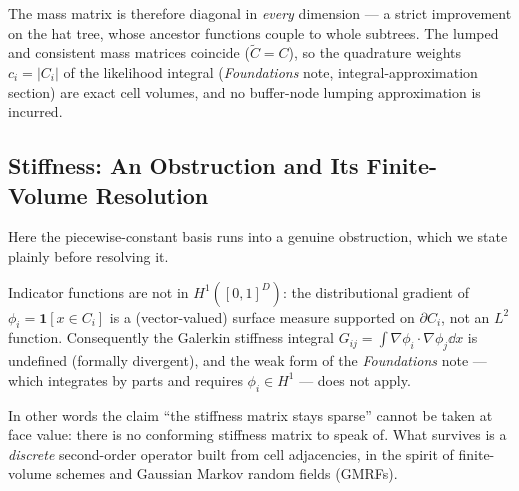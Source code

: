 \documentclass[11pt]{article}
\begin{document}
The mass matrix is therefore diagonal in \emph{every} dimension --- a strict
improvement on the hat tree, whose ancestor functions couple to whole subtrees.
The lumped and consistent mass matrices coincide ($\tilde C=C$), so the
quadrature weights $c_i=|C_i|$ of the likelihood integral
(\emph{Foundations} note, integral-approximation section) are exact cell volumes,
and no buffer-node lumping approximation is incurred.

\subsection{Stiffness: An Obstruction and Its Finite-Volume Resolution}
\label{sec:const-stiffness}

Here the piecewise-constant basis runs into a genuine obstruction, which we state
plainly before resolving it.

\begin{proposition}
\label{prop:const-stiff-illdef}
Indicator functions are not in $H^1([0,1]^D)$: the distributional gradient of
$\phi_i=\mathbf 1[x\in C_i]$ is a (vector-valued) surface measure supported on
$\partial C_i$, not an $L^2$ function.  Consequently the Galerkin stiffness
integral $G_{ij}=\int\nabla\phi_i\cdot\nabla\phi_j\dd x$ is undefined (formally
divergent), and the weak form of the \emph{Foundations} note --- which integrates
by parts and requires $\phi_i\in H^1$ --- does not apply.
\end{proposition}

In other words the claim ``the stiffness matrix stays sparse'' cannot be taken at
face value: there is no conforming stiffness matrix to speak of.  What survives
is a \emph{discrete} second-order operator built from cell adjacencies, in the
spirit of finite-volume schemes and Gaussian Markov random fields (GMRFs).
\end{document}

